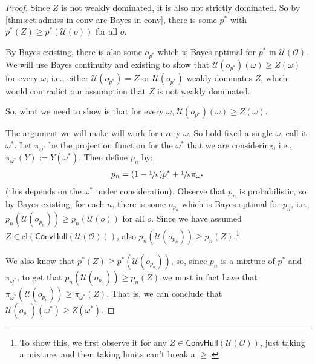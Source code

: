 \documentclass[a4paper]{article}
\newcommand\cl{\mathrm{cl}}
\renewcommand\O{\mathcal{O}}
\newcommand\Uwald{\mathcal{U}} %
\newcommand{\Conv}{\mathsf{ConvHull}}
\renewcommand{\geq}{\geqslant}
\newenvironment{CCM rewritten}
{\begingroup\color{blue}} %
{\endgroup}              %
\begin{document}
	\begin{proof}
		Since $Z$ is not weakly dominated, it is also not strictly dominated. So by \cref{thm:cct:admiss in conv are Bayes in conv}, there is some $p^*$ with $p^*(Z)\geq p^*(\Uwald(o))$ for all $o$. 
		
		By Bayes existing, there is also some $o_{p^*}$ which is Bayes optimal for $p^*$ in $\Uwald(\O)$. 
		We will use Bayes continuity and existing to show that $\Uwald(o_{p^*})(\omega)\geq Z(\omega)$ for every $\omega$, i.e., either $\Uwald(o_{p^*})=Z$ or $\Uwald(o_{p^*})$ weakly dominates $Z$, which would contradict our assumption that $Z$ is not weakly dominated. 
		
		So, what we need to show is that for every  $\omega$, $\Uwald(o_{p^*})(\omega)\geq Z(\omega)$. 
		
		The argument we will make will work for every $\omega$. So hold fixed a single $\omega$, call it $\omega^*$. Let $\pi_{\omega^*}$ be the projection function for the ${\omega^*}$ that we are considering, i.e., $\pi_{\omega^*}(Y):=Y({\omega^*})$. Then define $p_n$ by:
		\begin{align}
			p_n=(1-\sfrac{1}{n})p^*+\sfrac{1}{n} \pi_{{\omega^*}}
		\end{align}(this depends on the $\omega^*$ under consideration). Observe that $p_n$ is probabilistic, so by Bayes existing, for each $n$, there is some $o_{p_n}$ which is Bayes optimal for $p_n$, i.e., $p_n(\Uwald(o_{p_n}))\geq p_n(\Uwald(o))$ for all $o$. Since we have assumed $Z\in\cl(\Conv(\Uwald(\O)))$, also $p_n( \Uwald(o_{p_n}))\geq p_n(Z)$.\footnote{To show this, we first observe it for any $Z\in \Conv(\Uwald(\O))$, just taking a mixture, and then taking limits can't break a $\geq$.}
		
		We also know that $p^*(Z)\geq p^*(\Uwald(o_{p_n}))$, so, since $p_n$ is a mixture of $p^*$ and $\pi_{\omega^*}$,  to get that $p_n( \Uwald(o_{p_n}))\geq p_n(Z)$ we must in fact have that $\pi_{{\omega^*}}(\Uwald(o_{p_n}))\geq \pi_{\omega^*}(Z)$. That is, we can conclude that $\Uwald(o_{p_n})(\omega^*)\geq Z(\omega^*)$. 
		
		

\end{proof}
\end{document}
